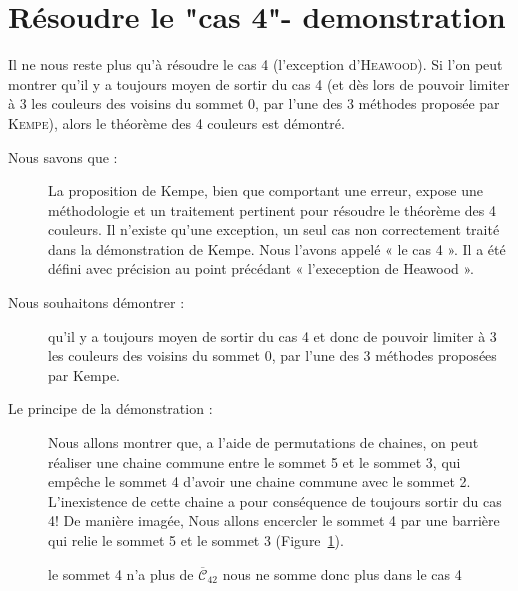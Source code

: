 \section{Résoudre le "cas 4"- demonstration}
Il ne nous reste plus qu'à résoudre le cas 4  (l'exception d'\textsc{Heawood}). Si l'on peut montrer qu'il y a toujours moyen de sortir du cas 4 (et dès lors de pouvoir limiter à 3 les couleurs des voisins du sommet 0, par l'une des 3 méthodes proposée par \textsc{Kempe}), alors le théorème des 4 couleurs est démontré.
\\
\begin{description}
	\item [Nous savons que :]
La proposition de Kempe, bien que comportant une erreur, expose une méthodologie et un traitement pertinent pour résoudre le théorème des 4 couleurs.
Il n'existe qu'une exception, un seul cas non correctement traité dans la démonstration de Kempe. Nous l'avons appelé « le cas 4 ». Il a été défini avec précision au point précédant « l'exeception de Heawood ».\\

	\item [Nous souhaitons démontrer :]
qu’il y a toujours moyen de sortir du cas 4 et donc de pouvoir limiter à 3 les couleurs des voisins du sommet 0, par l’une des 3 méthodes proposées par Kempe.\\


	\item [Le principe de la démonstration :]
Nous allons montrer que, a l'aide de permutations de chaines, on peut réaliser une chaine commune entre le sommet 5 et le sommet 3, qui empêche le sommet 4 d'avoir une chaine commune avec le sommet 2. L’inexistence de cette chaine a pour conséquence de toujours sortir du cas 4! De manière imagée, Nous allons encercler le sommet 4 par une barrière qui relie le sommet 5 et le sommet 3 (Figure~\ref{fig:cas4_r15_4}).
\end{description}
\FloatBarrier
\begin{figure}[!ht]\centering
		
	\caption{le sommet 4 n'a plus de $\overline{\mathcal{C}}_{42}$ nous ne somme donc plus dans le cas 4}\label{fig:cas4_r15_4}
\end{figure}
\FloatBarrier

